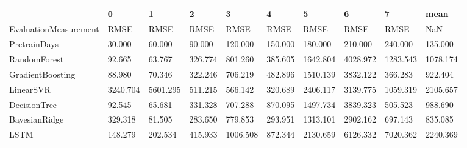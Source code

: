 \begin{tabular}{llllllllll}
\toprule
{} &        0 &        1 &       2 &        3 &       4 &        5 &        6 &        7 &     mean \\
\midrule
EvaluationMeasurement &     RMSE &     RMSE &    RMSE &     RMSE &    RMSE &     RMSE &     RMSE &     RMSE &      NaN \\
PretrainDays          &   30.000 &   60.000 &  90.000 &  120.000 & 150.000 &  180.000 &  210.000 &  240.000 &  135.000 \\
RandomForest          &   92.665 &   63.767 & 326.774 &  801.260 & 385.605 & 1642.804 & 4028.972 & 1283.543 & 1078.174 \\
GradientBoosting      &   88.980 &   70.346 & 322.246 &  706.219 & 482.896 & 1510.139 & 3832.122 &  366.283 &  922.404 \\
LinearSVR             & 3240.704 & 5601.295 & 511.215 &  566.142 & 320.689 & 2406.117 & 3139.775 & 1059.319 & 2105.657 \\
DecisionTree          &   92.545 &   65.681 & 331.328 &  707.288 & 870.095 & 1497.734 & 3839.323 &  505.523 &  988.690 \\
BayesianRidge         &  329.318 &   81.505 & 283.650 &  779.853 & 293.951 & 1313.101 & 2902.162 &  697.143 &  835.085 \\
LSTM                  &  148.279 &  202.534 & 415.933 & 1006.508 & 872.344 & 2130.659 & 6126.332 & 7020.362 & 2240.369 \\
\bottomrule
\end{tabular}
